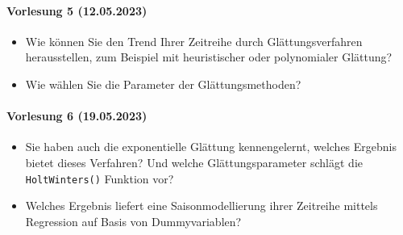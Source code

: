 \paragraph{Vorlesung 5 (12.05.2023)}
\begin{itemize}
    \item Wie können Sie den Trend Ihrer Zeitreihe durch Glättungsverfahren herausstellen, zum Beispiel mit heuristischer oder polynomialer Glättung? 
    \item Wie wählen Sie die Parameter der Glättungsmethoden?
\end{itemize}

\paragraph{Vorlesung 6 (19.05.2023)}
\begin{itemize}
    \item Sie haben auch die exponentielle Glättung kennengelernt, welches Ergebnis bietet dieses Verfahren? Und welche Glättungsparameter schlägt die \texttt{HoltWinters()} Funktion vor?
    \item Welches Ergebnis liefert eine Saisonmodellierung ihrer Zeitreihe mittels Regression auf Basis von Dummyvariablen?
\end{itemize}
